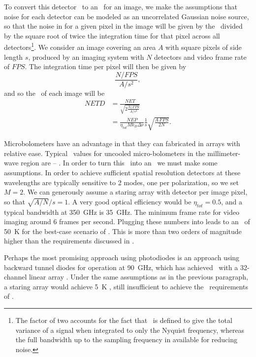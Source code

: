 To convert this detector \NET\ to an \NETD\ for an image, we make the assumptions that noise for each detector can be modeled as an uncorrelated Gaussian noise source, so that the noise in for a given pixel in the image will be given by the \NET\ divided by the square root of twice the integration time for that pixel across all detectors\footnote{%
  The factor of two accounts for the fact that \NEP\ is defined to give the total variance of a signal when integrated to only the Nyquist frequency, whereas the full bandwidth up to the sampling frequency in available for reducing noise.
}. 
We consider an image covering an area $A$ with square pixels of side length $s$, produced by an imaging system with $N$ detectors and video frame rate of $FPS$.
The integration time per pixel will then be given by
\begin{equation}
  \frac{N / FPS}{A / s^2},
\end{equation}
and so the \NETD\ of each image will be
\begin{align}
  NETD & = \frac{NET}{\sqrt{ 2 \frac{N / FPS}{A / s^2}}} \\
       & = \frac{NEP}{\eta_{tot} M k_B \Delta \nu} \frac{1}{s} \sqrt{\frac{A\,FPS}{2 N}} .
       \label{eqn:ch1-netd-defn}
\end{align}

Microbolometers have an advantage in that they can fabricated in arrays with relative ease.
Typical \NEP\ values for uncooled micro-bolometers in the millimeter-wave region are -- \cite{nemarich_microbolometer_2005,rogalski_terahertz_2011}.
In order to turn this \NEP\ into an \NETD\ we must make some assumptions.
In order to achieve sufficient spatial resolution detectors at these wavelengths are typically sensitive to 2 modes, one per polarization, so we set $M = 2$.
We can generously assume a staring array with detector per image pixel, so that $\sqrt{A/N}/s = 1$.
A very good optical efficiency would be $\eta_{tot} = 0.5$, and a typical bandwidth at \SI{350}{\GHz} is \SI{35}{\GHz}.
The minimum frame rate for video imaging around 6 frames per second.
Plugging these numbers into  leads to an \NETD\ of \SI{50}{\K} for the best-case scenario of  \NEP.
This is more than two orders of magnitude higher than the requirements discussed in .

Perhaps the most promising approach using photodiodes is an approach using backward tunnel diodes for operation at \SI{90}{\GHz}, which has achieved  \NEP\ with a 32-channel linear array \cite{schaffner_wideband_2008,wikner_demonstration_2009}.
Under the same assumptions as in the previous paragraph, a staring array would achieve \SI{5}{\K} \NETD, still insufficient to achieve the \NETD\ requirements of .

